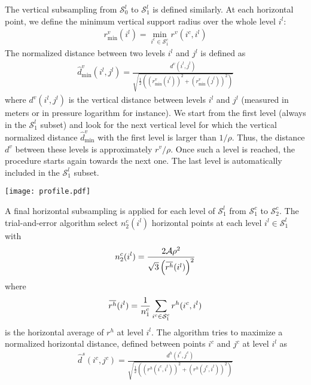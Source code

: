 \documentclass[12pt]{scrartcl}
\newcommand{\overbar}[1]{\mkern 1.5mu\overline{\mkern-1.5mu#1\mkern-1.5mu}\mkern 1.5mu}
\begin{document}
The vertical subsampling from $\mathcal{S}^l_0$ to $\mathcal{S}^l_1$ is defined similarly. At each horizontal point, we define the minimum vertical support radius over the whole level $i^l$:
\begin{align}
r^v_\mathrm{min}(i^l) = \min_{i^c \in \mathcal{S}^c_1} r^v(i^c,i^l)
\end{align}
The normalized distance between two levels $i^l$ and $j^l$ is defined as
\begin{align}
\widehat{d}^v_\text{min}(i^l,j^l) = \frac{d^v(i^l,j^l)}{\displaystyle \sqrt{\frac{1}{2}\left(\left(r^v_\mathrm{min}(i^l)\right)^2+\left(r^v_\mathrm{min}(j^l)\right)^2\right)}}
\end{align}
where $d^v(i^l,j^l)$ is the vertical distance between levels $i^l$ and $j^l$ (measured in meters or in pressure logarithm for instance). We start from the first level (always in the $\mathcal{S}^l_1$ subset) and look for the next vertical level for which the vertical normalized distance $\widehat{d}^v_\text{min}$ with the first level is larger than $1/\rho$. Thus, the distance $d^v$ between these levels is approximately $r^v/\rho$. Once such a level is reached, the procedure starts again towards the next one. The last level is automatically included in the $\mathcal{S}^l_1$ subset.

\begin{center}
\texttt{[image: profile.pdf]}
\end{center}

A final horizontal subsampling is applied for each level of $\mathcal{S}^l_1$ from $\mathcal{S}^c_1$ to $\mathcal{S}^c_2$. The trial-and-error algorithm select $n^c_2(i^l)$ horizontal points at each level $i^l \in \mathcal{S}^l_1$ with
\begin{align}
n^c_2(i^l) = \frac{2 \mathcal{A} \rho^2}{\sqrt{3} \left(\overbar{r^h}(i^l)\right)^2}
\end{align}
where
\begin{align}
\overbar{r^h}(i^l) = \frac{1}{n^c_1} \sum_{i^c \in \mathcal{S}^c_1} r^h(i^c,i^l)
\end{align}
is the horizontal average of $r^h$ at level $i^l$. The algorithm tries to maximize a normalized horizontal distance, defined between points $i^c$ and $j^c$ at level $i^l$ as
\begin{align}
\widehat{d}^s(i^c,j^c) = \frac{d^h(i^c,j^c)}{\displaystyle \sqrt{\frac{1}{2}\left(\left(r^h(i^c,i^l)\right)^2+\left(r^h(j^c,i^l)\right)^2\right)}}
\end{align}
\end{document}
